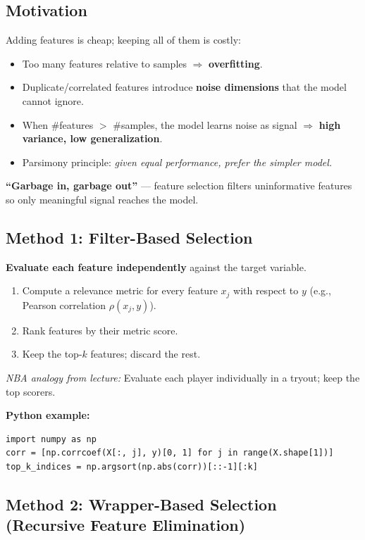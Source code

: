 \documentclass[11pt]{article}
\begin{document}
\subsection{Motivation}
Adding features is cheap; keeping all of them is costly:

\begin{itemize}
    \item Too many features relative to samples $\Rightarrow$ \textbf{overfitting}.
    \item Duplicate/correlated features introduce \textbf{noise dimensions} that the model cannot ignore.
    \item When \#features $>$ \#samples, the model learns noise as signal $\Rightarrow$ \textbf{high variance, low generalization}.
    \item Parsimony principle: \emph{given equal performance, prefer the simpler model.}
\end{itemize}

\textbf{``Garbage in, garbage out''} --- feature selection filters uninformative features so only meaningful signal reaches the model.

\subsection{Method 1: Filter-Based Selection}
\textbf{Evaluate each feature independently} against the target variable.

\begin{enumerate}
    \item Compute a relevance metric for every feature $x_j$ with respect to $y$ (e.g., Pearson correlation $\rho(x_j, y)$).
    \item Rank features by their metric score.
    \item Keep the top-$k$ features; discard the rest.
\end{enumerate}

\textit{NBA analogy from lecture:} Evaluate each player individually in a tryout; keep the top scorers.

\textbf{Python example:}
\begin{verbatim}
import numpy as np
corr = [np.corrcoef(X[:, j], y)[0, 1] for j in range(X.shape[1])]
top_k_indices = np.argsort(np.abs(corr))[::-1][:k]
\end{verbatim}

\subsection{Method 2: Wrapper-Based Selection (Recursive Feature Elimination)}
\end{document}
